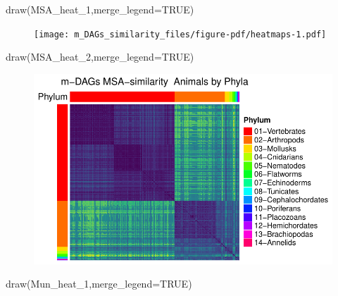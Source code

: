 \documentclass[
  letterpaper,
  DIV=11,
  numbers=noendperiod]{scrreprt}
\newenvironment{Shaded}{}{}
\newcommand{\AttributeTok}[1]{\textcolor[rgb]{0.78,0.47,0.87}{#1}}
\newcommand{\ConstantTok}[1]{\textcolor[rgb]{0.82,0.60,0.40}{#1}}
\newcommand{\FunctionTok}[1]{\textcolor[rgb]{0.38,0.69,0.94}{#1}}
\newcommand{\NormalTok}[1]{\textcolor[rgb]{0.67,0.70,0.75}{#1}}
\begin{document}
\begin{Shaded}
\begin{Highlighting}[]
\FunctionTok{draw}\NormalTok{(MSA\_heat\_1,}\AttributeTok{merge\_legend=}\ConstantTok{TRUE}\NormalTok{)}
\end{Highlighting}
\end{Shaded}

\begin{figure}[H]

{\centering \texttt{[image: m\_DAGs\_similarity\_files/figure-pdf/heatmaps-1.pdf]}

}

\end{figure}

\begin{Shaded}
\begin{Highlighting}[]
\FunctionTok{draw}\NormalTok{(MSA\_heat\_2,}\AttributeTok{merge\_legend=}\ConstantTok{TRUE}\NormalTok{)}
\end{Highlighting}
\end{Shaded}

\begin{figure}[H]

{\centering \includegraphics[width=1\textwidth,height=\textheight]{m_DAGs_similarity_files/figure-pdf/heatmaps-2.pdf}

}

\end{figure}

\begin{Shaded}
\begin{Highlighting}[]
\FunctionTok{draw}\NormalTok{(Mun\_heat\_1,}\AttributeTok{merge\_legend=}\ConstantTok{TRUE}\NormalTok{)}
\end{Highlighting}
\end{Shaded}
\end{document}
